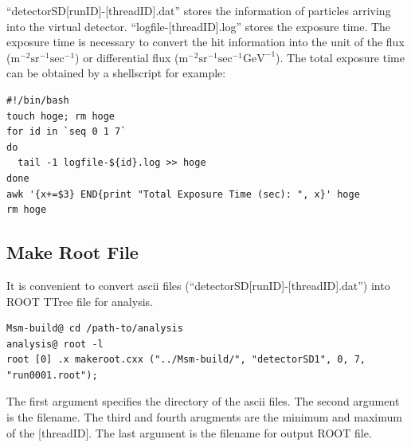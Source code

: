 \documentclass[11pt,a4paper]{jsarticle}
\begin{document}
``detectorSD[runID]-[threadID].dat'' stores the information of particles arriving into
the virtual detector. ``logfile-[threadID].log'' stores the exposure time.
The exposure time is necessary to convert the hit information into the unit of the flux 
($\mathrm{m^{-2} sr^{-1} sec^{-1}}$) or differential flux ($\mathrm{m^{-2} sr^{-1} sec^{-1} GeV^{-1}}$).
The total exposure time can be obtained by a shellscript for example:

\begin{screen}
{\small
\begin{verbatim}
#!/bin/bash
touch hoge; rm hoge
for id in `seq 0 1 7`
do
  tail -1 logfile-${id}.log >> hoge
done
awk '{x+=$3} END{print "Total Exposure Time (sec): ", x}' hoge
rm hoge
\end{verbatim}}
\end{screen}



\subsection{Make Root File}
It is convenient to convert ascii files (``detectorSD[runID]-[threadID].dat'') into ROOT TTree file for analysis.
\begin{screen}
{\small
\begin{verbatim}
Msm-build@ cd /path-to/analysis
analysis@ root -l 
root [0] .x makeroot.cxx ("../Msm-build/", "detectorSD1", 0, 7, "run0001.root");
\end{verbatim}}
\end{screen}
The first argument specifies the directory of the ascii files. The second argument is the filename.
The third and fourth arugments are the minimum and maximum of the [threadID]. The last argument 
is the filename for output ROOT file.
\end{document}
